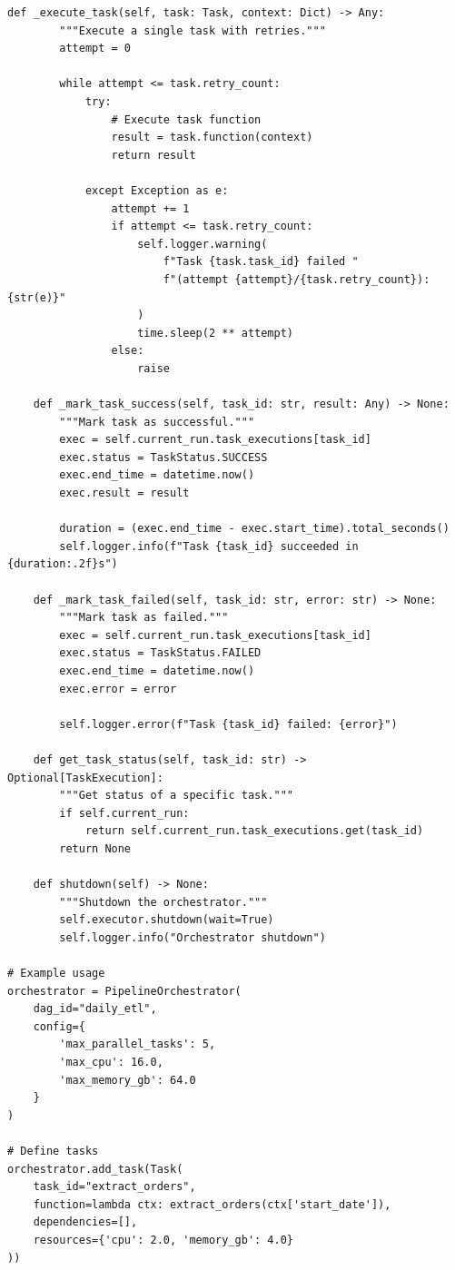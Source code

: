 \begin{lstlisting}[style=python, caption=PipelineOrchestrator with Dependency Management]
    def _execute_task(self, task: Task, context: Dict) -> Any:
        """Execute a single task with retries."""
        attempt = 0

        while attempt <= task.retry_count:
            try:
                # Execute task function
                result = task.function(context)
                return result

            except Exception as e:
                attempt += 1
                if attempt <= task.retry_count:
                    self.logger.warning(
                        f"Task {task.task_id} failed "
                        f"(attempt {attempt}/{task.retry_count}): {str(e)}"
                    )
                    time.sleep(2 ** attempt)
                else:
                    raise

    def _mark_task_success(self, task_id: str, result: Any) -> None:
        """Mark task as successful."""
        exec = self.current_run.task_executions[task_id]
        exec.status = TaskStatus.SUCCESS
        exec.end_time = datetime.now()
        exec.result = result

        duration = (exec.end_time - exec.start_time).total_seconds()
        self.logger.info(f"Task {task_id} succeeded in {duration:.2f}s")

    def _mark_task_failed(self, task_id: str, error: str) -> None:
        """Mark task as failed."""
        exec = self.current_run.task_executions[task_id]
        exec.status = TaskStatus.FAILED
        exec.end_time = datetime.now()
        exec.error = error

        self.logger.error(f"Task {task_id} failed: {error}")

    def get_task_status(self, task_id: str) -> Optional[TaskExecution]:
        """Get status of a specific task."""
        if self.current_run:
            return self.current_run.task_executions.get(task_id)
        return None

    def shutdown(self) -> None:
        """Shutdown the orchestrator."""
        self.executor.shutdown(wait=True)
        self.logger.info("Orchestrator shutdown")

# Example usage
orchestrator = PipelineOrchestrator(
    dag_id="daily_etl",
    config={
        'max_parallel_tasks': 5,
        'max_cpu': 16.0,
        'max_memory_gb': 64.0
    }
)

# Define tasks
orchestrator.add_task(Task(
    task_id="extract_orders",
    function=lambda ctx: extract_orders(ctx['start_date']),
    dependencies=[],
    resources={'cpu': 2.0, 'memory_gb': 4.0}
))


\end{lstlisting}
